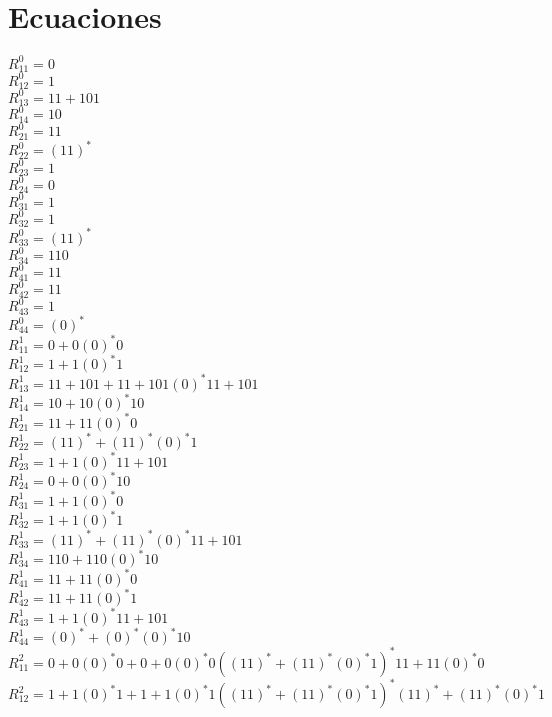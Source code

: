 \documentclass[11pt,a4paper]{report}
\begin{document}
	
		\section{Ecuaciones}
		$R_{11}^{0} = 0$\\
$R_{12}^{0} = 1$\\
$R_{13}^{0} = 11+101$\\
$R_{14}^{0} = 10$\\
$R_{21}^{0} = 11$\\
$R_{22}^{0} = (11)^{*}$\\
$R_{23}^{0} = 1$\\
$R_{24}^{0} = 0$\\
$R_{31}^{0} = 1$\\
$R_{32}^{0} = 1$\\
$R_{33}^{0} = (11)^{*}$\\
$R_{34}^{0} = 110$\\
$R_{41}^{0} = 11$\\
$R_{42}^{0} = 11$\\
$R_{43}^{0} = 1$\\
$R_{44}^{0} = (0)^{*}$\\
$R_{11}^{1} = 0+0(0)^{*}0$\\
$R_{12}^{1} = 1+1(0)^{*}1$\\
$R_{13}^{1} = 11+101+11+101(0)^{*}11+101$\\
$R_{14}^{1} = 10+10(0)^{*}10$\\
$R_{21}^{1} = 11+11(0)^{*}0$\\
$R_{22}^{1} = (11)^{*}+(11)^{*}(0)^{*}1$\\
$R_{23}^{1} = 1+1(0)^{*}11+101$\\
$R_{24}^{1} = 0+0(0)^{*}10$\\
$R_{31}^{1} = 1+1(0)^{*}0$\\
$R_{32}^{1} = 1+1(0)^{*}1$\\
$R_{33}^{1} = (11)^{*}+(11)^{*}(0)^{*}11+101$\\
$R_{34}^{1} = 110+110(0)^{*}10$\\
$R_{41}^{1} = 11+11(0)^{*}0$\\
$R_{42}^{1} = 11+11(0)^{*}1$\\
$R_{43}^{1} = 1+1(0)^{*}11+101$\\
$R_{44}^{1} = (0)^{*}+(0)^{*}(0)^{*}10$\\
$R_{11}^{2} = 0+0(0)^{*}0+0+0(0)^{*}0((11)^{*}+(11)^{*}(0)^{*}1)^{*}11+11(0)^{*}0$\\
$R_{12}^{2} = 1+1(0)^{*}1+1+1(0)^{*}1((11)^{*}+(11)^{*}(0)^{*}1)^{*}(11)^{*}+(11)^{*}(0)^{*}1$\\
\end{document}
